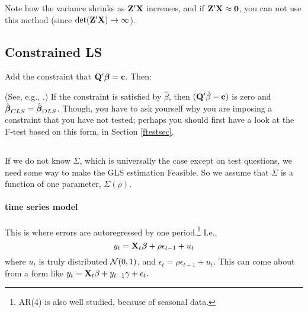 
Note how the variance shrinks as ${\bf Z}'{\bf X}$ increases, and if
${\bf Z}'{\bf X}\approx{\bf 0}$, you can not use this method (since
$\det({\bf Z}'{\bf X}) \to \infty$). 

\subsection{Constrained LS }

Add the constraint that ${\bf Q}'{\mbox{\boldmath$\beta$}}={\bf c}$. Then:

(See, e.g., \cite{amemiya:ez}.)
If the constraint is satisfied by $\hat\beta$, then
$({\bf Q}'\hat\beta-{\bf c})$ is zero and $\hat{{\mbox{\boldmath$\beta$}}}_{CLS}=\hat{{\mbox{\boldmath$\beta$}}}_{OLS}$.
Though, you have to ask yourself why you are imposing a constraint that
you have not tested; perhaps you should first have a look at the F-test
based on this form, in Section \ref{ftestsec}.

\subsection{}

If we do not know $\Sigma$, which is universally the case except on
test questions, we need some way to make the GLS estimation Feasible. So we
assume that $\Sigma$ is a function of one parameter, $\Sigma(\rho)$.

\label{ts}
\paragraph{ time series model}

This is where errors are autoregressed by one period.\footnote{AR(4) is
also well studied, because of seasonal data.} I.e.,
$$y_t={\bf X}_t{\mbox{\boldmath$\beta$}} + \rho\epsilon_{t-1} + u_t$$
where $u_t$ is truly distributed ${\cal N}(0,1)$, and $\epsilon_t=
\rho\epsilon_{t-1} + u_t$. This can come about from  a form like
$y_t={\bf X}_t\beta + y_{t-1}\gamma + \epsilon_t.$


